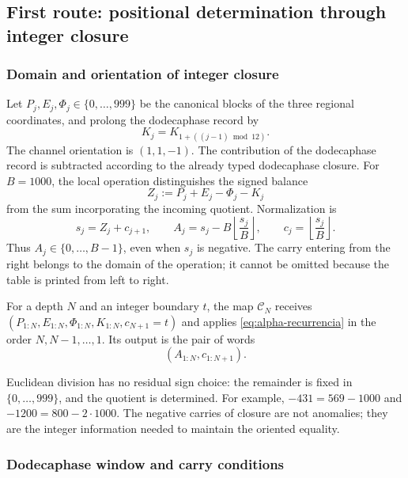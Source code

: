 \subsection{First route: positional determination through integer closure}
\subsubsection{Domain and orientation of integer closure}
\label{subsec:alpha-dominio}

Let \(P_j,E_j,\Phi_j\in\{0,\ldots,999\}\) be the canonical blocks of
the three regional coordinates, and prolong the dodecaphase record by
\[
 K_j=K_{1+((j-1)\bmod12)}.
\]
The channel orientation is \((1,1,-1)\). The contribution of the dodecaphase record is
subtracted according to the already typed dodecaphase closure. For \(B=1000\), the
local operation distinguishes the signed balance
\[
 Z_j:=P_j+E_j-\Phi_j-K_j
\]
from the sum incorporating the incoming quotient. Normalization is
\begin{equation}
 s_j=Z_j+c_{j+1},\qquad
 A_j=s_j-B\left\lfloor\frac{s_j}{B}\right\rfloor,
 \qquad c_j=\left\lfloor\frac{s_j}{B}\right\rfloor.
 \label{eq:alpha-recurrencia}
\end{equation}
Thus \(A_j\in\{0,\ldots,B-1\}\), even when \(s_j\) is
negative. The carry entering from the right belongs to the domain of
the operation; it cannot be omitted because the table is printed from left
to right.

\begin{definition}
\label{def:alpha-finita}
For a depth \(N\) and an integer boundary \(t\), the map
\(\mathcal C_N\) receives
\((P_{1:N},E_{1:N},\Phi_{1:N},K_{1:N},c_{N+1}=t)\) and applies
\eqref{eq:alpha-recurrencia} in the order \(N,N-1,\ldots,1\). Its output
is the pair of words
\[
 (A_{1:N},c_{1:N+1}).
\]
\end{definition}

Euclidean division has no residual sign choice: the remainder is
fixed in \(\{0,\ldots,999\}\), and the quotient is determined. For
example, \(-431=569-1000\) and \(-1200=800-2\cdot1000\). The
negative carries of closure are not anomalies; they are the integer
information needed to maintain the oriented equality.

\subsubsection{Dodecaphase window and carry conditions}
\label{subsec:alpha-ventana}

